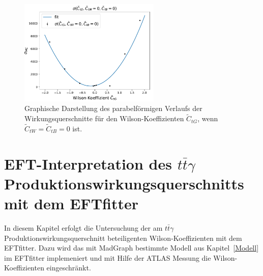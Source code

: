 \begin{figure}
  \centering
  \includegraphics[width=0.6\textwidth]{Plots/combi_plot_tG.pdf}
  \caption{Graphische Darstellung des parabelförmigen Verlaufs der Wirkungsquerschnitte für den Wilson-Koeffizienten $\tilde{C}_{tG}$, wenn $\tilde{C}_{tW}=\tilde{C}_{tB}=0$ ist.}
  \label{fig:WtG}
\end{figure}
%
%
\chapter{EFT-Interpretation des \texorpdfstring {$t\bar{t}\gamma$}{math} Produktionswirkungsquerschnitts mit dem EFTfitter}
In diesem Kapitel erfolgt die Untersuchung der am $t\bar{t}\gamma$ Produktionswirkungsquerschnitt beteiligenten Wilson-Koeffizienten mit dem EFTfitter. Dazu wird das mit MadGraph bestimmte Modell aus Kapitel~\ref{Modell} im EFTfitter implemeniert und mit Hilfe der ATLAS Messung die Wilson-Koeffizienten eingeschränkt.


